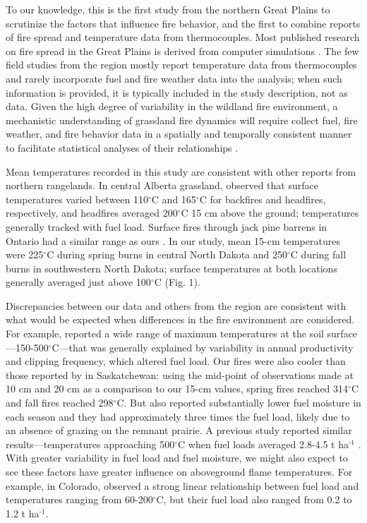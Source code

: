 \documentclass[referee, 
		     sn-basic]{sn-jnl}
\begin{document}
\begin{linenumbers}
To our knowledge, this is the first study from the northern Great Plains
to scrutinize the factors that influence fire behavior, and the first to
combine reports of fire spread and temperature data from thermocouples.
Most published research on fire spread in the Great Plains is derived
from computer simulations
\citep{mcgranahan2013, overholt2014, yurkonis2019}. The few field
studies from the region mostly report temperature data from
thermocouples and rarely incorporate fuel and fire weather data into the
analysis; when such information is provided, it is typically included in
the study description, not as data. Given the high degree of variability
in the wildland fire environment, a mechanistic understanding of
grassland fire dynamics will require collect fuel, fire weather, and
fire behavior data in a spatially and temporally consistent manner to
facilitate statistical analyses of their relationships
\citep{hiers2020, mcgranahan2018}.

Mean temperatures recorded in this study are consistent with other
reports from northern rangelands. In central Alberta grassland,
\citet{bailey1980} observed that surface temperatures varied between
110\(^\circ\)C and 165\(^\circ\)C for backfires and headfires,
respectively, and headfires averaged 200\(^\circ\)C 15 cm above the
ground; temperatures generally tracked with fuel load. Surface fires
through jack pine barrens in Ontario had a similar range as ours
\citep[140-545\(^\circ\)C,][]{smith1966}. In our study, mean 15-cm
temperatures were 225\(^\circ\)C during spring burns in central North
Dakota and 250\(^\circ\)C during fall burns in southwestern North
Dakota; surface temperatures at both locations generally averaged just
above 100\(^\circ\)C (Fig. 1).

Discrepancies between our data and others from the region are consistent
with what would be expected when differences in the fire environment are
considered. For example, \citet{ohrtman2015} reported a wide range of
maximum temperatures at the soil surface---150-500\(^\circ\)C---that was
generally explained by variability in annual productivity and clipping
frequency, which altered fuel load. Our fires were also cooler than
those reported by \citet{archibold2003} in Saskatchewan: using the
mid-point of observations made at 10 cm and 20 cm as a comparison to our
15-cm values, spring fires reached 314\(^\circ\)C and fall fires reached
298\(^\circ\)C. But \citet{archibold2003} also reported substantially
lower fuel moisture in each season and they had approximately three
times the fuel load, likely due to an absence of grazing on the remnant
prairie. A previous study reported similar results---temperatures
approaching 500\(^\circ\)C when fuel loads averaged 2.8-4.5 t
ha\(^{\text{-}1}\) \citep{archibold1998}. With greater variability in
fuel load and fuel moisture, we might also expect to see these factors
have greater influence on aboveground flame temperatures. For example,
in Colorado, \citet{augustine2014} observed a strong linear relationship
between fuel load and temperatures ranging from 60-200\(^\circ\)C, but
their fuel load also ranged from 0.2 to 1.2 t ha\(^{\text{-}1}\).


\end{linenumbers}
\end{document}
